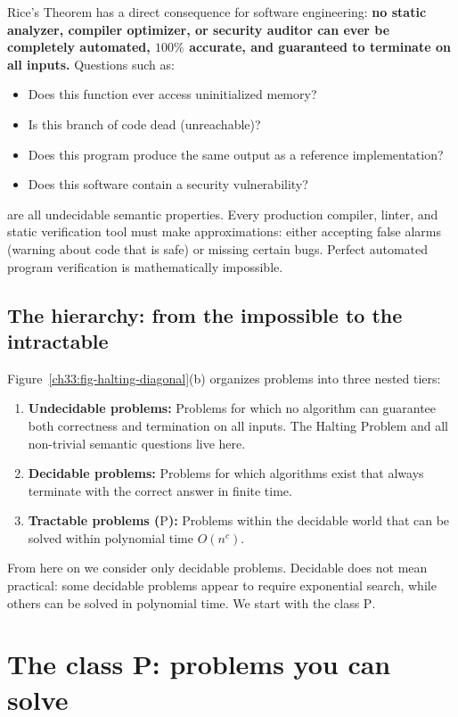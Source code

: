 Rice's Theorem has a direct consequence for software engineering: \textbf{no static analyzer, compiler optimizer, or security auditor can ever be completely automated, $100\%$ accurate, and guaranteed to terminate on all inputs.}
Questions such as:
\begin{itemize}
  \item Does this function ever access uninitialized memory?
  \item Is this branch of code dead (unreachable)?
  \item Does this program produce the same output as a reference implementation?
  \item Does this software contain a security vulnerability?
\end{itemize}
are all undecidable semantic properties. Every production compiler, linter, and static verification tool must make approximations: either accepting false alarms (warning about code that is safe) or missing certain bugs. Perfect automated program verification is mathematically impossible.

\subsection{The hierarchy: from the impossible to the intractable}

Figure~\ref{ch33:fig-halting-diagonal}(b) organizes problems into three nested tiers:
\begin{enumerate}
  \item \textbf{Undecidable problems:} Problems for which no algorithm can guarantee both correctness and termination on all inputs. The Halting Problem and all non-trivial semantic questions live here.
  \item \textbf{Decidable problems:} Problems for which algorithms exist that always terminate with the correct answer in finite time.
  \item \textbf{Tractable problems ($\mathrm{P}$):} Problems within the decidable world that can be solved within polynomial time $O(n^c)$.
\end{enumerate}

From here on we consider only decidable problems. Decidable does not mean practical: some decidable problems appear to require exponential search, while others can be solved in polynomial time. We start with the class $\mathrm{P}$.

\section{The class P: problems you can solve}

